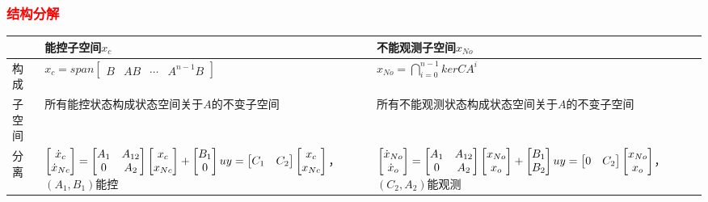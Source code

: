 \documentclass[
12pt, %
a4paper, 
oneside, %
]{scrartcl}
\begin{document}
\subsubsection[结构分解]{\textcolor{red}{结构分解}}
\begin{table}[H]
\centering
\footnotesize
\begin{tabular}{|p{1.1cm}|p{7.5cm}|p{8.5cm}|}
\hline
 & 能控子空间$ x_c $ & 不能观测子空间$ x_{No} $ \\
\hline
构成 & $ x_c = span \begin{bmatrix} B & A B & \cdots & A^{n - 1} B \end{bmatrix} $ & $ x_{No} = \bigcap_{i = 0}^{n - 1} ker C A^i $ \\
\hline
子空间 & 所有能控状态构成状态空间关于$ A $的不变子空间 & 所有不能观测状态构成状态空间关于$ A $的不变子空间 \\
\hline
\multirow{2}{*}{分离} & $ \begin{bmatrix} \dot{x}_c \\ \dot{x}_{Nc} \end{bmatrix} = \begin{bmatrix} A_1 & A_{12} \\ 0 & A_2 \end{bmatrix} \begin{bmatrix} x_c \\ x_{Nc} \end{bmatrix} + \begin{bmatrix} B_1 \\ 0 \end{bmatrix} u \newline y = \begin{bmatrix} C_1 & C_2 \end{bmatrix} \begin{bmatrix} x_c \\ x_{Nc} \end{bmatrix} $，$ (A_1, B_1) $能控 & $ \begin{bmatrix} \dot{x}_{No} \\ \dot{x}_o \end{bmatrix} = \begin{bmatrix} A_1 & A_{12} \\ 0 & A_2 \end{bmatrix} \begin{bmatrix} x_{No} \\ x_o \end{bmatrix} + \begin{bmatrix} B_1 \\ B_2 \end{bmatrix} u \newline y = \begin{bmatrix} 0 & C_2 \end{bmatrix} \begin{bmatrix} x_{No} \\ x_o \end{bmatrix} $，$ (C_2, A_2) $能观测 \\

\end{tabular}
\end{table}
\end{document}
